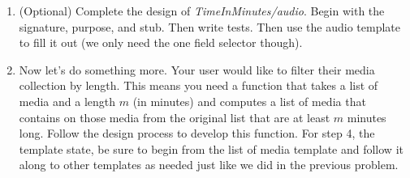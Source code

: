 \documentclass{article}
\begin{document}
\begin{enumerate}
\begin{enumerate}
    \vspace{5in}

    \item (Optional) Complete the design of \textit{TimeInMinutes/audio}. Begin with the signature, purpose, and stub. Then write tests. Then use the audio template to fill it out (we only need the one field selector though).

    \newpage \thispagestyle{empty}

    \item Now let's do something more. Your user would like to filter their media collection by length. This means you need a function that takes a list of media and a length \(m\) (in minutes) and computes a list of media that contains on those media from the original list that are at least \(m\) minutes long. Follow the design process to develop this function. For step 4, the template state, be sure to begin from the list of media template and follow it along to other templates as needed just like we did in the previous problem.

  \end{enumerate}
\end{enumerate}
\end{document}

